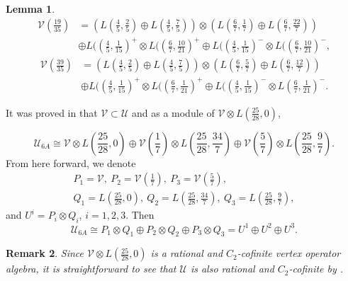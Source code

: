 \documentclass{article}
\newtheorem{lemma}{Lemma}[section]
\newtheorem{remark}[lemma]{Remark}
\begin{document}
\begin{lemma}
		\begin{align*}
			\mathcal{V}\left(\frac{19}{35}\right) & =\left(L\left(\frac{4}{5},\frac{2}{5}\right)\oplus L\left(\frac{4}{5},\frac{7}{5}\right)\right)\otimes\left(L\left(\frac{6}{7},\frac{1}{7}\right)\oplus L\left(\frac{6}{7},\frac{22}{7}\right)\right)\\
			& \oplus L(\left(\frac{4}{5},\frac{1}{15}\right)^{+}\otimes L(\left(\frac{6}{7},\frac{10}{21}\right)^{+}\oplus L(\left(\frac{4}{5},\frac{1}{15}\right)^{-}\otimes L(\left(\frac{6}{7},\frac{10}{21}\right)^{-},
		\end{align*}
		\begin{align*}
			\mathcal{V}\left(\frac{39}{35}\right) & =\left(L\left(\frac{4}{5},\frac{2}{5}\right)\oplus L\left(\frac{4}{5},\frac{7}{5}\right)\right)\otimes\left(L\left(\frac{6}{7},\frac{5}{7}\right)\oplus L\left(\frac{6}{7},\frac{12}{7}\right)\right)\\
			& \oplus L(\left(\frac{4}{5},\frac{1}{15}\right)^{+}\otimes L(\left(\frac{6}{7},\frac{1}{21}\right)^{+}\oplus L(\left(\frac{4}{5},\frac{1}{15}\right)^{-}\otimes L\left(\frac{6}{7},\frac{1}{21}\right)^{-}.
		\end{align*}
		
	\end{lemma}
	
	
	It was proved in \cite{LYY} that $\mathcal{V}\subset\mathcal{U}$
	and as a module of $\mathcal{V}\otimes L\left(\frac{25}{28},0\right)$,
	
	\[
	\mathcal{U}_{6A}\cong\mathcal{V}\otimes L\left(\frac{25}{28},0\right)\oplus\mathcal{V}\left(\frac{1}{7}\right)\otimes L\left(\frac{25}{28},\frac{34}{7}\right)\oplus\mathcal{V}\left(\frac{5}{7}\right)\otimes L\left(\frac{25}{28},\frac{9}{7}\right).
	\]
	From here forward, we denote
	\begin{gather}
		P_{1}=\mathcal{V},\ P_{2}=\mathcal{V}\left(\frac{1}{7}\right),\ P_{3}=\mathcal{V}\left(\frac{5}{7}\right),\nonumber \\
		Q_{1}=L\left(\frac{25}{28},0\right),\ Q_{2}=L\left(\frac{25}{28},\frac{34}{7}\right),\ Q_{3}=L\left(\frac{25}{28},\frac{9}{7}\right),\label{PQ notation}
	\end{gather}
	and $U^{i}=P_{i}\otimes Q_{i}$, $i=1,2,3$. Then
	\[
	\mathcal{U}_{6A}\cong P_{1}\otimes Q_{1}\oplus P_{2}\otimes Q_{2}\oplus P_{3}\otimes Q_{3}=U^{1}\oplus U^{2}\oplus U^{3}.
	\]
	
	\begin{remark} \label{rationality-1} Since $\mathcal{V}\otimes L\left(\frac{25}{28},0\right)$
		is a rational and $C_{2}$-cofinite vertex operator algebra, it is
		straightforward to see that $\mathcal{U}$ is also rational and $C_{2}$-cofinite
		by \rm{\cite{ABD,HKL}}. \end{remark}
	
\end{document}
